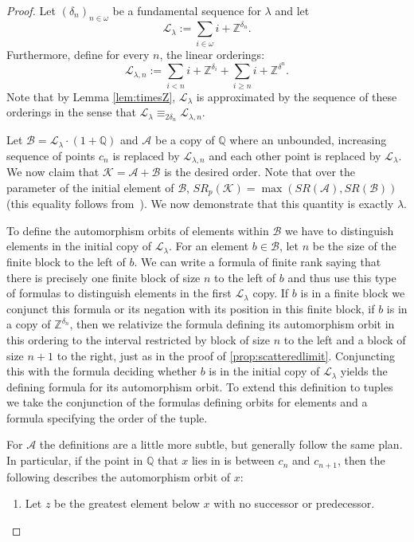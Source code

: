 \documentclass[10pt,a4paper]{amsart}
\providecommand{\A}{\mathcal{A}}
\providecommand{\L}{\mathcal{L}}
\providecommand{\B}{\mathcal{B}}
\newcommand{\SR}{SR}
\newcommand{\Q}{\mathbb{Q}}
\newcommand{\Z}{\mathbb{Z}}
\newcommand{\K}{\mathcal{K}}
\renewcommand{\L}{\mathcal{L}}
\begin{document}
\begin{proof}
    Let $(\delta_n)_{n\in\omega}$ be a
    fundamental sequence for $\lambda$ and let 
\[\L_\lambda:=\sum_{i\in\omega}i+\Z^{\delta_n}.\]
Furthermore, define for every $n$, the linear orderings:
\[\L_{\lambda,n}:=\sum_{i< n} i+\Z^{\delta_i}+\sum_{i\geq n} i+\Z^{\delta^n}.\]
Note that by Lemma \ref{lem:timesZ}, $\L_\lambda$ is approximated by the
sequence of these orderings in the sense that $\L_\lambda\equiv_{2\delta_n}\L_{\lambda,n}.$

Let $\B=\L_\lambda\cdot(1+\Q)$ and $\A$ be a copy of $\Q$ where an unbounded,
increasing sequence of points $c_n$ is replaced by $\L_{\lambda,n}$ and each
other point is replaced by $\L_\lambda$. We now claim that $\K=\A+\B$ is the
desired order. Note that over the parameter of the initial element of $\B$,
$\SR_p(\K)=\max(\SR(\A),\SR(\B))$ (this equality follows from~\cite[Lemma
11]{GM23}). We now demonstrate that this quantity is exactly $\lambda$.

To define the automorphism orbits of elements within $\B$ we have to distinguish
elements in the initial copy of $\L_\lambda$. For an element $b\in \B$, let $n$
be the size of the finite block to the left of $b$. We can write a formula of
finite rank saying that there is precisely one finite block of size $n$
to the left of $b$ and thus use this type of formulas to distinguish elements in
the first $\L_\lambda$ copy. If $b$ is in a finite block we conjunct this
formula or its negation with its position in this finite block, if $b$ is in a
copy of $\Z^{\delta_n}$, then we relativize the formula defining its
automorphism orbit in this ordering to the interval restricted by block of size
$n$ to the left and a block of size $n+1$ to the right, just as in the proof of
\cref{prop:scatteredlimit}. Conjuncting this with the formula deciding whether
$b$ is in the initial copy of $\L_\lambda$ yields the defining formula for its
automorphism orbit. To extend this definition to tuples we take the conjunction
of the formulas defining orbits for elements and a formula specifying the order
of the tuple.

For $\A$ the definitions are a little more subtle, but generally follow the same
plan. In particular, if the point in $\Q$ that $x$ lies in is between $c_n$ and
$c_{n+1}$, then the following describes the automorphism orbit of $x$:

\begin{enumerate}
    \item Let $z$ be the greatest element below $x$ with no successor or predecessor.


\end{enumerate}
\end{proof}
\end{document}
